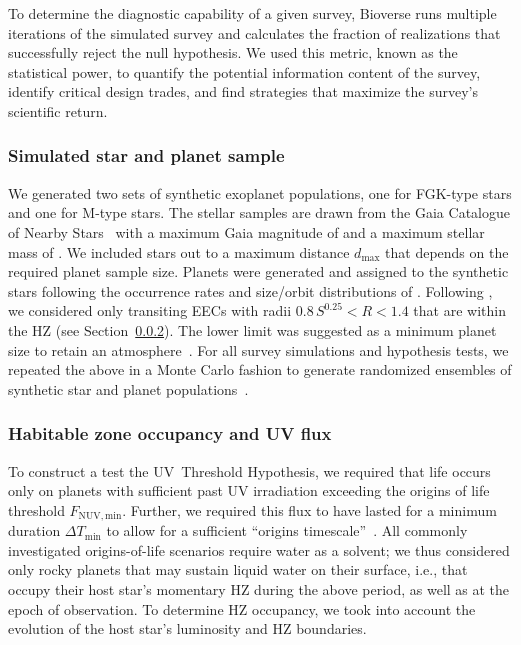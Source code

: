 \documentclass[twocolumn,twocolappendix,linenumbers]{aastex631}
\begin{document}
To determine the diagnostic capability of a given survey, Bioverse runs multiple iterations of the simulated survey and calculates the fraction of realizations that successfully reject the null hypothesis.
We used this metric, known as the statistical power, to quantify the potential information content of the survey, identify critical design trades, and find strategies that maximize the survey's scientific return.


\subsubsection{Simulated star and planet sample}
We generated two sets of synthetic exoplanet populations, one for FGK-type stars and one for M-type stars.
The stellar samples are drawn from the Gaia Catalogue of Nearby Stars~\citep{Smart2021} with a maximum Gaia magnitude of  and a maximum stellar mass of  \SI{}{\Msun}.
We included stars out to a maximum distance $d_{\max}$ that depends on the required planet sample size.
Planets were generated and assigned to the synthetic stars following the occurrence rates and size/orbit distributions of \citet{Bergsten2022}.
Following \citet{Bixel2021}, we considered only transiting \glspl{EEC} with radii $0.8\, S^{0.25} < R < 1.4 $ that are within the \gls{HZ} (see Section~\ref{sec:met-hz}).
The lower limit was suggested as a minimum planet size to retain an atmosphere~\citep{Zahnle2017}.
For all survey simulations and hypothesis tests, we repeated the above in a Monte Carlo fashion to generate randomized ensembles of synthetic star and planet populations~\citep[][]{Bixel2021}.



\subsubsection{Habitable zone occupancy and UV flux}\label{sec:met-hz}
To construct a test the UV~Threshold Hypothesis, we required that life occurs only on planets with sufficient past \gls{UV} irradiation exceeding the origins of life threshold $F_\mathrm{NUV, min}$.
Further, we required this flux to have lasted for a minimum duration $\Delta T_\mathrm{min}$ to allow for a sufficient ``origins timescale''~\citep{Rimmer2023}.
All commonly investigated origins-of-life scenarios require water as a solvent;
we thus considered only rocky planets that may sustain liquid water on their surface, i.e., that occupy their host star's momentary \gls{HZ} during the above period, as well as at the epoch of observation.
To determine \gls{HZ} occupancy, we took into account the evolution of the host star's luminosity and \gls{HZ} boundaries.
\end{document}
